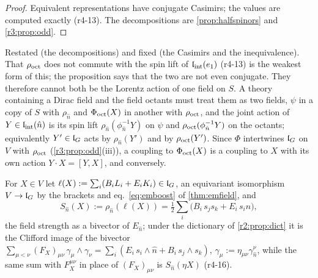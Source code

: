 \begin{proof}
Equivalent representations have conjugate Casimirs; the values are computed exactly (r4-13). The decompositions are \cref{prop:halfspinors} and \cref{r3:prop:odd}.
\end{proof}

Restated (the decompositions) and fixed (the Casimirs and the inequivalence). That $\rho_{\rm oct}$ does not commute with the spin lift of
$\mathfrak l_{\rm int}(e_1)$ (r4-13) is the weakest form of this; the proposition says that the two are not even conjugate. They therefore cannot both be the Lorentz
action of one field on $S$. A theory containing a Dirac field and the field octants must treat them as two fields, $\psi$ in a copy of $S$ with
$\rho_{\hat n}$ and $\Phi_{\rm oct}(X)$ in another with $\rho_{\rm oct}$, and the joint action of $Y\in\mathfrak l_{\rm int}(\hat n)$ is its spin lift $\rho_{\hat n}(\phi_{\hat n}^{-1}Y)$ on $\psi$ and
$\rho_{\rm oct}(\phi_{\hat n}^{-1}Y)$ on the octants; equivalently $Y'\in\mathfrak l_G$ acts by $\rho_{\hat n}(Y')$ and by $\rho_{\rm oct}(Y')$.
Since $\Phi$ intertwines $\mathfrak l_G$ on $V$ with $\rho_{\rm oct}$ (\cref{r3:prop:odd}(iii)), a coupling to $\Phi_{\rm oct}(X)$ is a coupling to $X$ with its own action
$Y\cdot X=[Y,X]$, and conversely.

For $X\in V$ let $\ell(X):=\sum_i(B_iL_i+E_iK_i)\in\mathfrak l_G$, an equivariant isomorphism $V\to\mathfrak l_G$ by the brackets and eq.~\cref{eq:emboost} of \cref{thm:emfield}, and
\[
S_{\hat n}(X):=\rho_{\hat n}(\ell(X))=\tfrac12\sum_i\bigl(B_i\,s_js_k+E_i\,s_in\bigr),
\]
the field strength as a bivector of $E_{\hat n}$; under the dictionary of \cref{r2:prop:dict} it is the Clifford image of the bivector
$\sum_{\mu<\nu}(F_X)_{\mu\nu}\,\gamma_\mu\wedge\gamma_\nu=\sum_i(E_i\,s_i\wedge \hat n+B_i\,s_j\wedge s_k)$, $\gamma_\mu:=\eta_{\mu\nu}\gamma^\nu_{\hat n}$, while the same sum
with $F_X^{\mu\nu}$ in place of $(F_X)_{\mu\nu}$ is $S_{\hat n}(\eta X)$ (r4-16).

